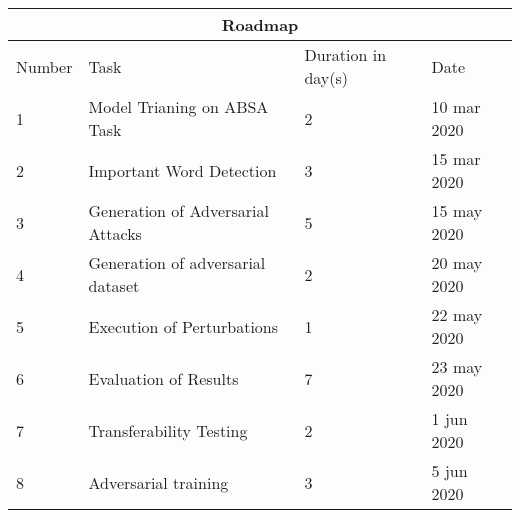 \begin{tabular}{ |p{1.5cm}||p{7cm}|p{2cm}|p{3cm}|  }
 \hline
 \multicolumn{4}{|c|}{Roadmap} \\
 \hline
Number & Task & Duration in day(s) & Date\\
 \hline
 1 & Model Trianing on ABSA Task & 2 & 10 mar 2020 \\
 2 & Important Word Detection & 3 & 15 mar 2020\\
 3 & Generation of Adversarial Attacks & 5 & 15 may 2020\\
 4 & Generation of adversarial dataset & 2 & 20 may 2020\\
 5 & Execution of Perturbations & 1 & 22 may 2020\\
 6 & Evaluation of Results & 7 & 23 may 2020\\
 7 & Transferability Testing & 2 & 1 jun 2020\\
 8 & Adversarial training & 3 & 5 jun 2020 \\
 \hline
\end{tabular}



